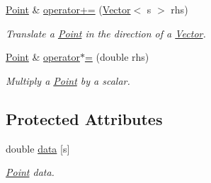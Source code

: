 \begin{DoxyCompactItemize}
\hyperlink{classzbe_1_1_point}{Point} \& \hyperlink{classzbe_1_1_point_affd866729abeadf7cfed39e9cc7148c4}{operator+=} (\hyperlink{classzbe_1_1_vector}{Vector}$<$ s $>$ rhs)
\begin{DoxyCompactList}\small\item\em Translate a \hyperlink{classzbe_1_1_point}{Point} in the direction of a \hyperlink{classzbe_1_1_vector}{Vector}. \end{DoxyCompactList}\item 
\hyperlink{classzbe_1_1_point}{Point} \& \hyperlink{classzbe_1_1_point_a7a0c2c5f931f27051bdb4e0ef8e25633}{operator$\ast$=} (double rhs)
\begin{DoxyCompactList}\small\item\em Multiply a \hyperlink{classzbe_1_1_point}{Point} by a scalar. \end{DoxyCompactList}\end{DoxyCompactItemize}
\subsection*{Protected Attributes}
\begin{DoxyCompactItemize}
\item 
double \hyperlink{classzbe_1_1_point_a44784a8fc0112f976473e8e2da0193e5}{data} \mbox{[}s\mbox{]}
\begin{DoxyCompactList}\small\item\em \hyperlink{classzbe_1_1_point}{Point} data. \end{DoxyCompactList}\end{DoxyCompactItemize}
